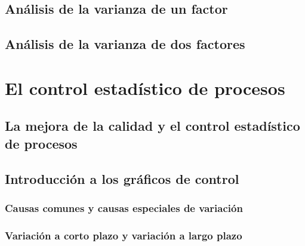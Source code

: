 \documentclass[
  letterpaper,
]{scrbook}
\begin{document}
\hypertarget{anuxe1lisis-de-la-varianza-de-un-factor}{%
\section{Análisis de la varianza de un
factor}\label{anuxe1lisis-de-la-varianza-de-un-factor}}

\hypertarget{anuxe1lisis-de-la-varianza-de-dos-factores}{%
\section{Análisis de la varianza de dos
factores}\label{anuxe1lisis-de-la-varianza-de-dos-factores}}

\hypertarget{section}{%
\section{}\label{section}}


\hypertarget{el-control-estaduxedstico-de-procesos}{%
\chapter{El control estadístico de
procesos}\label{el-control-estaduxedstico-de-procesos}}

\hypertarget{la-mejora-de-la-calidad-y-el-control-estaduxedstico-de-procesos}{%
\section{La mejora de la calidad y el control estadístico de
procesos}\label{la-mejora-de-la-calidad-y-el-control-estaduxedstico-de-procesos}}

\hypertarget{introducciuxf3n-a-los-gruxe1ficos-de-control}{%
\section{Introducción a los gráficos de
control}\label{introducciuxf3n-a-los-gruxe1ficos-de-control}}

\hypertarget{causas-comunes-y-causas-especiales-de-variaciuxf3n}{%
\subsection{Causas comunes y causas especiales de
variación}\label{causas-comunes-y-causas-especiales-de-variaciuxf3n}}

\hypertarget{variaciuxf3n-a-corto-plazo-y-variaciuxf3n-a-largo-plazo}{%
\subsection{Variación a corto plazo y variación a largo
plazo}\label{variaciuxf3n-a-corto-plazo-y-variaciuxf3n-a-largo-plazo}}
\end{document}

